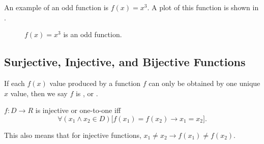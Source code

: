 \begin{ex}
  An example of an odd function is $f(x)=x^3$.
  A plot of this function is shown in .
  \begin{figure}[H]
    \begin{center}
    \end{center}
    \caption{$f(x)=x^3$ is an odd function.}
    \label{fig:functions:odd}
  \end{figure}
\end{ex}

\subsection{Surjective, Injective, and Bijective Functions}

\begin{defn}[injective]
  If each $f(x)$ value produced by a function $f$ can only be obtained by one 
  unique $x$ value, then we say $f$ is , or 
  .

  $ f: D \to R $ is injective or one-to-one iff
  \[
    \forall{(x_1 \wedge x_2 \in D)}
    \big[f(x_1)=f(x_2)
    \to x_1=x_2\big].
  \]
  \begin{remark}
    This also means that for injective functions,
    $ x_1 \neq x_2 \to f(x_1) \neq f(x_2)$.
  \end{remark}
\end{defn}

